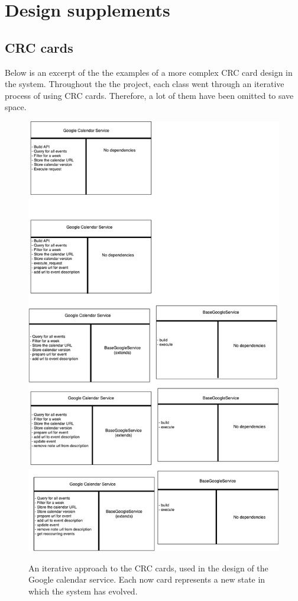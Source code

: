 \chapter{Design supplements}
\label{appendix:sup_design}

\section{CRC cards}\label{sup:crc}
Below is an excerpt of the the examples of a more complex CRC card design in the system. Throughout the the project, each class went through an iterative process of using CRC cards. Therefore, a lot of them have been omitted to save space.

\begin{figure}[H]
  \centering
  \includegraphics[scale=0.4]{images/google_calendar_service.pdf}
  \label{fig:crc_card_google_calendar}
  \caption{An iterative approach to the CRC cards, used in the design of the Google calendar service. Each now card represents a new state in which the system has evolved.}
\end{figure}

